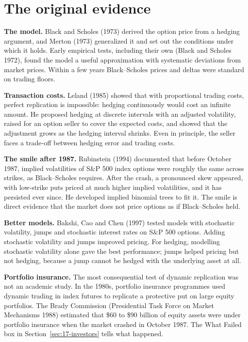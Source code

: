 \section{The original evidence}
\label{sec:17-evidence}

\textbf{The model.} Black and Scholes (1973) derived the option price from a hedging argument, and Merton (1973) generalized it and set out the conditions under which it holds. Early empirical tests, including their own (Black and Scholes 1972), found the model a useful approximation with systematic deviations from market prices. Within a few years Black--Scholes prices and deltas were standard on trading floors.

\textbf{Transaction costs.} Leland (1985) showed that with proportional trading costs, perfect replication is impossible: hedging continuously would cost an infinite amount. He proposed hedging at discrete intervals with an adjusted volatility, raised for an option seller to cover the expected costs, and showed that the adjustment grows as the hedging interval shrinks. Even in principle, the seller faces a trade-off between hedging error and trading costs.

\textbf{The smile after 1987.} Rubinstein (1994) documented that before October 1987, implied volatilities of S\&P 500 index options were roughly the same across strikes, as Black--Scholes requires. After the crash, a pronounced skew appeared, with low-strike puts priced at much higher implied volatilities, and it has persisted ever since. He developed implied binomial trees to fit it. The smile is direct evidence that the market does not price options as if Black--Scholes held.

\textbf{Better models.} Bakshi, Cao and Chen (1997) tested models with stochastic volatility, jumps and stochastic interest rates on S\&P 500 options. Adding stochastic volatility and jumps improved pricing. For hedging, modelling stochastic volatility alone gave the best performance; jumps helped pricing but not hedging, because a jump cannot be hedged with the underlying asset at all.

\textbf{Portfolio insurance.} The most consequential test of dynamic replication was not an academic study. In the 1980s, portfolio insurance programmes used dynamic trading in index futures to replicate a protective put on large equity portfolios. The Brady Commission (Presidential Task Force on Market Mechanisms 1988) estimated that \$60 to \$90 billion of equity assets were under portfolio insurance when the market crashed in October 1987. The What Failed box in Section~\ref{sec:17-investors} tells what happened.


